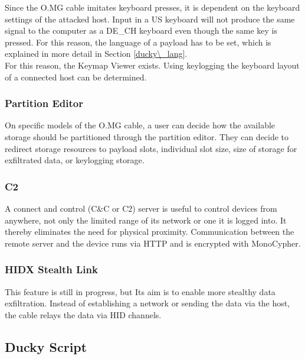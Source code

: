 Since the O.MG cable imitates keyboard presses, it is dependent on the keyboard settings of the attacked host. Input in a US keyboard will not produce the same signal to the computer as a DE\_CH keyboard even though the same key is pressed. For this reason, the language of a payload has to be set, which is explained in more detail in Section \ref{ducky\_lang}. \\
For this reason, the Keymap Viewer exists. Using keylogging the keyboard layout of a connected host can be determined. 

\subsubsection{Partition Editor}

On specific models of the O.MG cable, a user can decide how the available storage should be partitioned through the partition editor. They can decide to redirect storage resources to payload slots, individual slot size, size of storage for exfiltrated data, or keylogging storage. 

\subsubsection{C2}

A connect and control (C\&C or C2) server is useful to control devices from anywhere, not only the limited range of its network or one it is logged into. It thereby eliminates the need for physical proximity. Communication between the remote server and the device runs via HTTP and is encrypted with MonoCypher. 

\subsubsection{HIDX Stealth Link}
This feature is still in progress, but Its aim is to enable more stealthy data exfiltration. Instead of establishing a network or sending the data via the host, the cable relays the data via HID channels.  


\subsection{Ducky Script} \label{DuckyScript}

